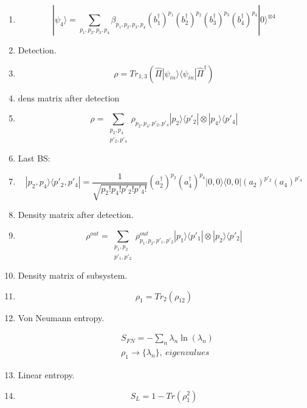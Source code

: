 \documentclass[12pt]{article}
\begin{document}
\begin{enumerate}
\item $$ |\psi_4\rangle = \sum_{p_{1},p_{2},p_{3},p_{4}} \beta_{p_{1},p_{2},p_{3},p_{4}} (b_{1}^{\dag})^{p_{1}}  (b_{2}^{\dag})^{p_{2}} (b_{3}^{\dag})^{p_{3}}  (b_{4}^{\dag})^{p_{4}} |0\rangle^{\otimes 4} $$

\item Detection.

\item $$  \rho =  Tr_{1,3}(\hat{\Pi} |\psi_{in}\rangle \langle \psi_{in}|   \hat{\Pi}^{\dag}) $$


\item dens matrix after detection

\item $$ \rho = \sum_{\substack{p_{2},p_{4} \\ p'_{2}, p'_{4}}}  \rho_{p_{2},p_{4}, p'_{2}, p'_{4}} |p_{2}\rangle \langle p'_{2}| \otimes |p_{4}\rangle \langle p'_{4}| $$

\item Last BS:

\item $$   |p_{2},p_{4}\rangle \langle p'_{2},p'_{4}| = \frac{1}{\sqrt{p_{2}!p_{4}!p'_{2}!p'_{4}!}} (a_{2}^{\dag})^{p_{2}} (a_{4}^{\dag})^{p_{4}} |0,0\rangle \langle 0,0| (a_{2})^{p'_{2}} (a_{4})^{p'_{4}}   $$


\item Density matrix after detection.

\item $$ \rho^{out} = \sum_{\substack{p_{1},p_{2} \\ p'_{1}, p'_{2}}}  \rho^{out}_{p_{1},p_{2}, p'_{1}, p'_{2}} |p_{1}\rangle \langle p'_{1}| \otimes |p_{2}\rangle \langle p'_{2}| $$

\item Density matrix of subsystem.

\item $$ \rho_{1} = Tr_{2}(\rho_{12}) $$

\item Von Neumann entropy.

\begin{align*}
& S_{FN} = - \sum_{n} \lambda_{n} \ln(\lambda_{n})  \\
& \rho_{1}   \rightarrow  \{ \lambda_{n} \}, \ eigenvalues 
\end{align*}

\item Linear entropy.
\item $$ S_{L} =  1 - Tr(\rho_{1}^2) $$


\end{enumerate}
\end{document}
